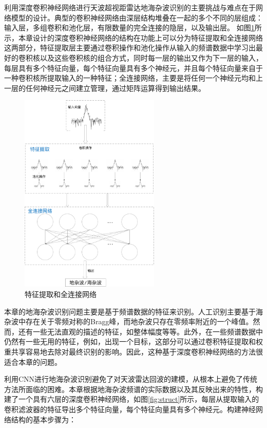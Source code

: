 利用深度卷积神经网络进行天波超视距雷达地海杂波识别的主要挑战与难点在于网络模型的设计。典型的卷积神经网络由深层结构堆叠在一起的多个不同的层组成：输入层，多组卷积和池化层，有限数量的完全连接的隐层，以及输出层。
如图\ref{fig:fullconnect}所示，本章设计的深度卷积神经网络的结构在功能上可以分为特征提取和全连接网络这两部分，特征提取层主要通过卷积操作和池化操作从输入的频谱数据中学习出最好的卷积核以及这些卷积核的组合方式，同时每一层的输出又作为下一层的输入，每层具有多个特征向量，每个特征向量具有多个神经元，并且每个特征向量来自于一种卷积核所提取输入的一种特征；全连接网络，主要是将任何一个神经元均和上一层的任何神经元之间建立管理，通过矩阵运算得到输出结果。
\begin{figure}[hbt]
	\centering
	\includegraphics[width=6.67cm]{figures/othr/fullconnect}
	\caption{特征提取和全连接网络}
	\label{fig:fullconnect}
\end{figure}

本章的地海杂波识别问题主要是基于频谱数据的特征来识别。人工识别主要基于海杂波中存在关于零频对称的Bragg峰，而地杂波只存在零频率附近的一个峰值。然而，还有一些无法直观的描述的特征，如整体幅度等等。此外，在一些频谱数据中仍然有一些无用的特征，例如，出现一个目标，这部分可以通过卷积特征提取和权重共享容易地去除对最终识别的影响。因此，这种基于深度卷积神经网络的方法很适合本章的问题。

利用CNN进行地海杂波识别避免了对天波雷达回波的建模，从根本上避免了传统方法所面临的困难。本章根据地海杂波频谱的实际数据以及其反映出来的特性，构建了一个具有六层的深度卷积神经网络，如图\ref{fig:struct}所示，每层从提取输入的卷积滤波器的特征导出多个特征向量，每个特征向量具有多个神经元。构建神经网络结构的基本步骤为：

